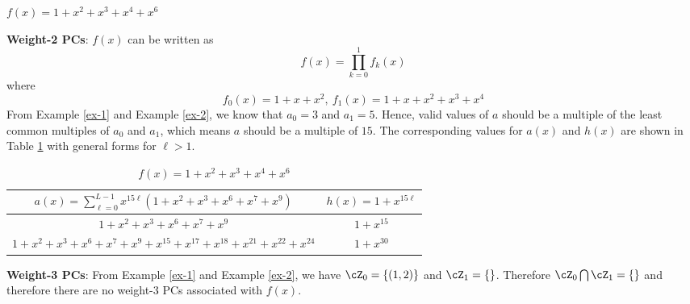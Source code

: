 \begin{example}
$f(x)=1+x^2+x^3+x^4+x^6$\newline

\textbf{Weight-2 PCs}: $f(x)$ can be written as 
$$f(x)=\prod_{k=0}^{1}f_k(x)$$
where 
$$f_0(x)=1+x+x^2,~f_1(x)=1+x+x^2+x^3+x^4$$ 
From Example \ref{ex-1} and Example \ref{ex-2}, we know that $a_0=3$ and $a_1=5$.
Hence, valid values of $a$ should be a multiple of the least common multiples of $a_0$ and $a_1$, which means $a$ should be a multiple of $15$.
The corresponding values for $a(x)$ and $h(x)$ are shown in Table \ref{novelTab1-c} with general forms for $\ell>1$.

\begin{table}[htbp]
\renewcommand{\arraystretch}{1.3}
 \caption{$f(x)=1+x^2+x^3+x^4+x^6$}
 \centering
\begin{tabular}{c c } 
\hline
 $a(x)=\sum_{\ell=0}^{L-1} x^{15\ell}(1+x^2+x^3+x^6+x^7+x^9)$ & $h(x)=1+x^{15\ell}$ \\ [0.5ex] 
\hline\hline
$1+x^2+x^3+x^6+x^7+x^9$ & $1+x^{15}$\\ 
$1+x^2+x^3+x^6+x^7+x^9+x^{15}+x^{17}+x^{18}+x^{21}+x^{22}+x^{24}$ & $1+x^{30}$ \\
\end{tabular}
 \label{novelTab1-c}
\end{table}

\textbf{Weight-3 PCs}:
From Example \ref{ex-1} and Example \ref{ex-2}, we have $\cZ_0=\{ (1,2)\}$ and $\cZ_1=\{ \}$. Therefore $\cZ_0 \bigcap \cZ_1= \{ \}$ and therefore there are no weight-3 PCs associated with $f(x)$.
\end{example}

